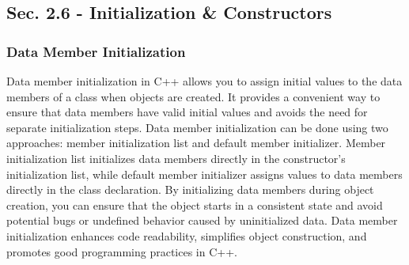 \subsection*{Sec. 2.6 - Initialization \& Constructors}
\subsubsection*{Data Member Initialization}

Data member initialization in C++ allows you to assign initial values to the data members of a class when objects are created. It provides a convenient way to ensure that data members have valid initial values and avoids 
the need for separate initialization steps. Data member initialization can be done using two approaches: member initialization list and default member initializer. Member initialization list initializes data members directly 
in the constructor's initialization list, while default member initializer assigns values to data members directly in the class declaration. By initializing data members during object creation, you can ensure that the object 
starts in a consistent state and avoid potential bugs or undefined behavior caused by uninitialized data. Data member initialization enhances code readability, simplifies object construction, and promotes good programming 
practices in C++.

